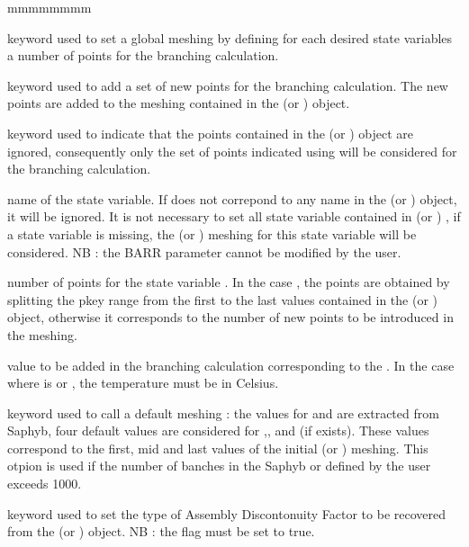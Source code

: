 \begin{ListeDeDescription}{mmmmmmmm}
\item[\moc{GLOBAL}] keyword used to set a global meshing by defining for each desired  state variables a number of points for the branching calculation.

\item[\moc{ADD}] keyword used to add a set of new points for the branching calculation. The new points are added to the meshing contained in the  (or )   object.

\item[\moc{NEW}] keyword used to indicate that the points contained in the  (or )   object are ignored, consequently only the set of points indicated using  will be considered for the branching calculation.

\item[\dusa{pkey}] name of the state variable. If  does not correpond to any name in the  (or )   object, it will be ignored.  It is not necessary to set all state variable contained in  (or )  , if a state variable is missing, the  (or )   meshing for this state variable will be considered. NB : the BARR parameter cannot be modified by the user.

\item[\dusa{nval}] number of points for the state variable . In the case , the  points are obtained by splitting the pkey range from the first to the last values contained in the   (or )   object, otherwise it corresponds to the number of new points to be introduced in the meshing.

\item[\dusa{val}] value to be added in the branching calculation corresponding to the . In the case where  is  or , the temperature must be in Celsius.

\item[\moc{DEF}] keyword used to call a default meshing : the values for  and  are extracted from Saphyb, four default values are considered for ,,  and   (if exists). These values correspond to the first, mid and last values of the initial  (or )   meshing. This otpion is used if the number of banches in the Saphyb or defined by the user exceeds 1000.

\item[\moc{ADF}] keyword used to set the type of Assembly Discontonuity Factor to be recovered from the  (or )   object. NB : the  flag must be set to true. 



\end{ListeDeDescription}
